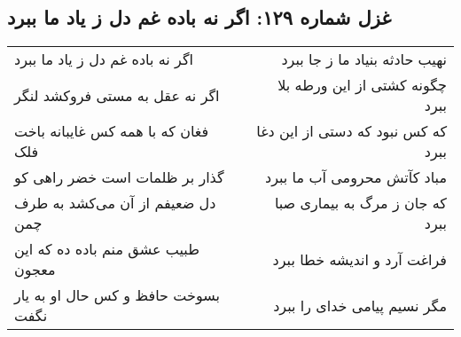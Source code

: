 \begin{center}
\section*{غزل شماره ۱۲۹: اگر نه باده غم دل ز یاد ما ببرد}
\label{sec:sh129}
\begin{longtable}{l p{0.5cm} r}
اگر نه باده غم دل ز یاد ما ببرد
&&
نهیب حادثه بنیاد ما ز جا ببرد
\\
اگر نه عقل به مستی فروکشد لنگر
&&
چگونه کشتی از این ورطه بلا ببرد
\\
فغان که با همه کس غایبانه باخت فلک
&&
که کس نبود که دستی از این دغا ببرد
\\
گذار بر ظلمات است خضر راهی کو
&&
مباد کآتش محرومی آب ما ببرد
\\
دل ضعیفم از آن می‌کشد به طرف چمن
&&
که جان ز مرگ به بیماری صبا ببرد
\\
طبیب عشق منم باده ده که این معجون
&&
فراغت آرد و اندیشه خطا ببرد
\\
بسوخت حافظ و کس حال او به یار نگفت
&&
مگر نسیم پیامی خدای را ببرد
\\
\end{longtable}
\end{center}
